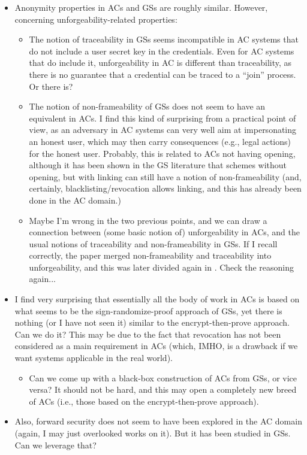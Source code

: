 \begin{itemize}
\item Anonymity properties in ACs and GSs are roughly similar. However, concerning
  unforgeability-related properties:
  \begin{itemize}
  \item The notion of traceability in GSs seems incompatible in AC systems that
    do not include a user secret key in the credentials. Even for AC systems that
    do include it, unforgeability in AC is different than traceability, as there
    is no guarantee that a credential can be traced to a ``join'' process. Or
    there is?
  \item The notion of non-frameability of GSs does not seem to have an equivalent
    in ACs. I find this kind of surprising from a practical point of view, as an
    adversary in AC systems can very well aim at impersonating an honest user,
    which may then carry consequences (e.g., legal actions) for the honest user.
    Probably, this is related to ACs not having opening, although it has been
    shown in the GS literature that schemes without opening, but with linking
    can still have a notion of non-frameability \cite{dl21} (and, certainly,
    blacklisting/revocation allows linking, and this has already been done in
    the AC domain.)
  \item Maybe I'm wrong in the two previous points, and we can draw a connection
    between (some basic notion of) unforgeability in ACs, and the usual notions
    of traceability and non-frameability in GSs. If I recall correctly, the
    \cite{bmw03} paper merged non-frameability and traceability into
    unforgeability, and this was later divided again in \cite{bsz05}. Check the
    reasoning again...
  \end{itemize}  
\item I find very surprising that essentially all the body of work in ACs is
  based on what seems to be the sign-randomize-proof approach of GSs, yet there
  is nothing (or I have not seen it) similar to the encrypt-then-prove approach.
  Can we do it? This may be due to the fact that revocation has not been
  considered as a main requirement in ACs (which, IMHO, is a drawback if we want
  systems applicable in the real world).
  \begin{itemize}
  \item Can we come up with a black-box construction of ACs from GSs, or vice
    versa? It should not be hard, and this may open a completely new breed of
    ACs (i.e., those based on the encrypt-then-prove approach).
  \end{itemize}
\item Also, forward security does not seem to have been explored in the AC
  domain (again, I may just overlooked works on it). But it has been studied in
  GSs. Can we leverage that?
\end{itemize}

